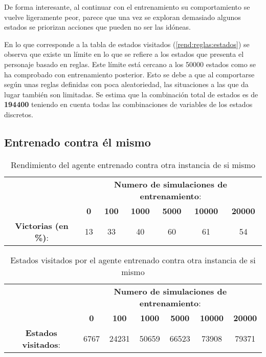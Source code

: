 \bigskip

De forma interesante, al continuar con el entrenamiento su comportamiento se vuelve ligeramente peor, parece que una vez se exploran demasiado algunos estados se priorizan acciones que pueden no ser las idóneas.

\bigskip

En lo que corresponde a la tabla de estados visitados (\ref{rend:reglas:estados}) se observa que existe un límite en lo que se refiere a los estados que presenta el personaje basado en reglas. Este límite está cercano a los 50000 estados como se ha comprobado con entrenamiento posterior. Esto se debe a que al comportarse según unas reglas definidas con poca aleatoriedad, las situaciones a las que da lugar también son limitadas. Se estima que la combinación total de estados es de \textbf{194400} teniendo en cuenta todas las combinaciones de variables de los estados discretos.

\subsection{Entrenado contra él mismo}
\label{agente2}

\begin{table}
	\begin{center}
		\begin{tabular}{c|c|c|c|c|c|c|}
			& \multicolumn{6}{c|}{\textbf{Numero de simulaciones de entrenamiento}:}\\
			\cline{2-7} & \textbf{0} & \textbf{100} & \textbf{1000} & \textbf{5000} & \textbf{10000} & \textbf{20000}\\
			
			\hline
			\textbf{Victorias (en \%)}: &  13 & 33 & 40 & 60 & 61 & 54\\
			
			\hline
		\end{tabular}
		\caption{Rendimiento del agente entrenado contra otra instancia de si mismo}
		\label{rend:el:victorias}
	\end{center}
\end{table}

\begin{table}
	\begin{center}
		\begin{tabular}{c|c|c|c|c|c|c|}
			& \multicolumn{6}{c|}{\textbf{Numero de simulaciones de entrenamiento}:}\\
			\cline{2-7} & \textbf{0} & \textbf{100} & \textbf{1000} & \textbf{5000} & \textbf{10000} & \textbf{20000}\\
			
			\hline
			\textbf{Estados visitados}: &  6767 & 24231 & 50659 & 66523 & 73908 & 79371 \\
			
			\hline
		\end{tabular}
		\caption{Estados visitados por el agente entrenado contra otra instancia de si mismo}
		\label{rend:el:estados}
	\end{center}
\end{table}

